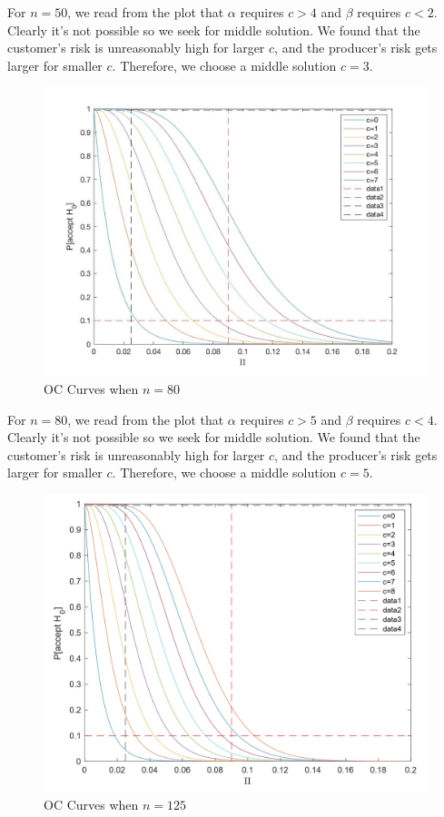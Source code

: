 \documentclass[a4paper]{article}
\begin{document}
For $n=50$, we read from the plot that $\alpha$ requires $c>4$ and $\beta$ requires $c<2$. Clearly it's not possible so we seek for middle solution. We found that the customer's risk is unreasonably high for larger $c$, and the producer's risk gets larger for smaller $c$. Therefore, we choose a middle solution $c=3$.

\begin{figure}[!htbp] 
\centering 
\includegraphics[width=0.7\linewidth]{n=80.jpg}  
\caption{OC Curves when $n = 80$} 
\end{figure}

For $n=80$, we read from the plot that $\alpha$ requires $c>5$ and $\beta$ requires $c<4$. Clearly it's not possible so we seek for middle solution. We found that the customer's risk is unreasonably high for larger $c$, and the producer's risk gets larger for smaller $c$. Therefore, we choose a middle solution $c=5$.

\newpage

\begin{figure}[!htbp] 
\centering 
\includegraphics[width=0.8\linewidth]{n=125.jpg}  
\caption{OC Curves when $n = 125$} 
\end{figure}
\end{document}
